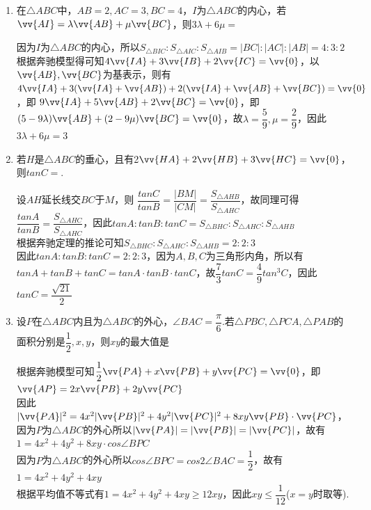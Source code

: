 \begin{enumerate}
\begin{enumerate}
        \item 在$\triangle ABC$中，$AB = 2, AC = 3, BC = 4$，$I$为$\triangle ABC$的内心，若$\vv{AI} = \lambda \vv{AB} + \mu \vv{BC}$，则$3\lambda + 6\mu = $
        \begin{jieda}
            因为$I$为$\triangle ABC$的内心，所以$S_{\triangle BIC} : S_{\triangle AIC}:S_{\triangle AIB} = |BC| : |AC| : |AB| = 4 : 3 : 2$\\
            根据奔驰模型得可知$4\vv{IA} + 3\vv{IB} + 2\vv{IC} = \vv{0}$，以$\vv{AB}, \vv{BC}$为基表示，则有$4\vv{IA} + 3(\vv{IA} + \vv{AB}) + 2(\vv{IA} + \vv{AB} + \vv{BC}) = \vv{0}$，即 $9\vv{IA} + 5\vv{AB} + 2\vv{BC} = \vv{0}$，即$ (5-9\lambda)\vv{AB} + (2-9\mu)\vv{BC} = \vv{0}$，故$\lambda = \dfrac{5}{9}, \mu = \dfrac{2}{9}$，因此$3\lambda + 6\mu = 3$
        \end{jieda}
        \item 若$H$是$\triangle ABC$的垂心，且有2$\vv{HA} + 2\vv{HB}+3\vv{HC} = \vv{0}$，则$tanC = $.
        \begin{jieda}
            设$AH$延长线交$BC$于$M$，则
            $\dfrac{tanC}{tanB} = \dfrac{|BM|}{|CM|} = \dfrac{S_{\triangle AHB}}{S_{\triangle AHC}}$，故同理可得$\dfrac{tanA}{tanB} = \dfrac{S_{\triangle AHC}}{S_{\triangle AHC}}$，因此$tanA: tanB : tanC = S_{\triangle BHC} : S_{\triangle AHC}:S_{\triangle AHB}$ \\
            根据奔驰定理的推论可知$S_{\triangle BHC} : S_{\triangle AHC}:S_{\triangle AHB} = 2:2:3$ \\
            因此$tanA: tanB : tanC = 2 : 2 : 3$，因为$A, B, C$为三角形内角，所以有$tanA + tanB + tanC = tanA \cdot tanB \cdot tanC$，故$\dfrac{7}{3}tanC = \dfrac{4}{9}tan^3C$，因此$tanC = \dfrac{\sqrt{21}}{2}$
        \end{jieda}
    \item 设$P$在$\triangle ABC$内且为$\triangle ABC$的外心，$\angle BAC = \dfrac{\pi}{6}$.若$\triangle PBC, \triangle PCA, \triangle PAB$的面积分别是$\dfrac{1}{2}, x, y$，则$xy$的最大值是
    \begin{jieda}
        根据奔驰模型可知$\dfrac{1}{2}\vv{PA} + x\vv{PB} + y\vv{PC} = \vv{0}$，即$\vv{AP} = 2x\vv{PB} + 2y\vv{PC}$\\
        因此$|\vv{PA}|^2 = 4x^2|\vv{PB}|^2 + 4y^2|\vv{PC}|^2 + 8xy\vv{PB} \cdot \vv{PC}$， 因为$P$为$\triangle ABC$的外心所以$|\vv{PA}| = |\vv{PB}| = |\vv{PC}|$，故有$1 = 4x^2 + 4y^2 + 8xy \cdot cos\angle BPC$\\
        因为$P$为$\triangle ABC$的外心所以$cos\angle BPC = cos 2\angle BAC = \dfrac{1}{2}$，故有$1 = 4x^2 + 4y^2 + 4xy$\\
        根据平均值不等式有$1 = 4x^2 + 4y^2 + 4xy \geq 12xy$，因此$xy \leq \dfrac{1}{12}$($x = y$时取等).
    \end{jieda}
    \end{enumerate}
\end{enumerate}